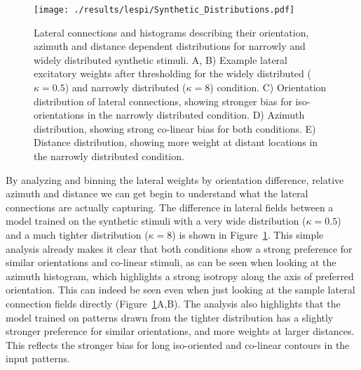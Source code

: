 \begin{figure}
	\centering
    \texttt{[image: ./results/lespi/Synthetic\_Distributions.pdf]}
	\caption[Distributions of lateral connections of models trained on
      synthetic stimuli]{Lateral connections and histograms describing
      their orientation, azimuth and distance dependent distributions
      for narrowly and widely distributed synthetic stimuli. A, B)
      Example lateral excitatory weights after thresholding for the
      widely distributed ($\kappa=0.5$) and narrowly distributed
      ($\kappa=8$) condition. C) Orientation distribution of lateral
      connections, showing stronger bias for iso-orientations in the
      narrowly distributed condition. D) Azimuth distribution, showing
      strong co-linear bias for both conditions. E) Distance
      distribution, showing more weight at distant locations in the
      narrowly distributed condition.}
	\label{SyntheticDistributions}
\end{figure}

By analyzing and binning the lateral weights by orientation
difference, relative azimuth and distance we can get begin to
understand what the lateral connections are actually capturing. The
difference in lateral fields between a model trained on the synthetic
stimuli with a very wide distribution ($\kappa=0.5$) and a much
tighter distribution ($\kappa=8$) is shown in
Figure~\ref{SyntheticDistributions}. This simple analysis already
makes it clear that both conditions show a strong preference for
similar orientations and co-linear stimuli, as can be seen when
looking at the azimuth histogram, which highlights a strong isotropy
along the axis of preferred orientation. This can indeed be seen even
when just looking at the sample lateral connection fields directly
(Figure~\ref{SyntheticDistributions}A,B). The analysis also highlights
that the model trained on patterns drawn from the tighter distribution
has a slightly stronger preference for similar orientations, and more
weights at larger distances. This reflects the stronger bias for long
iso-oriented and co-linear contours in the input patterns.

